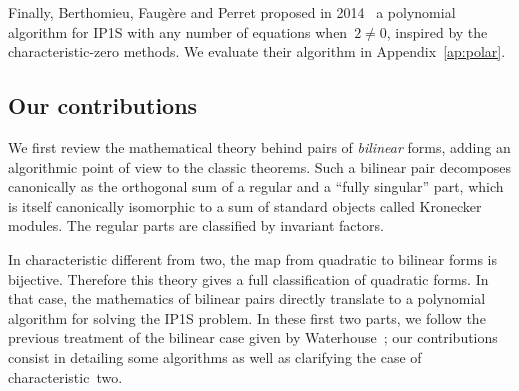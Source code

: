 \documentclass{lms}
\begin{document}
Finally, Berthomieu, Faugère and Perret
proposed in 2014~\cite{DBLP:journals/corr/BerthomieuFP13}
a polynomial algorithm for IP1S with any number of equations when~$2 ≠ 0$,
inspired by the characteristic-zero methods.
We evaluate their algorithm in Appendix~\ref{ap:polar}.


\subsection*{Our contributions}

We first review the mathematical theory behind pairs of \emph{bilinear} forms,
adding an algorithmic point of view to the classic theorems.
% 
Such a bilinear pair decomposes canonically as the orthogonal sum of
a regular and a ``fully singular'' part,
which is itself canonically isomorphic to a sum of standard objects
called Kronecker modules.
The regular parts are classified by invariant factors.

In characteristic different from two,
the map from quadratic to bilinear forms is bijective.
Therefore this theory gives a full classification of quadratic forms.
In that case, the mathematics of bilinear pairs
directly translate to a polynomial algorithm for solving the IP1S problem.
In these first two parts, we follow the previous treatment of
the bilinear case given by Waterhouse~\cite{inventiones1976waterhouse};
our contributions consist in detailing some algorithms
as well as clarifying the case of characteristic~two.
\end{document}
